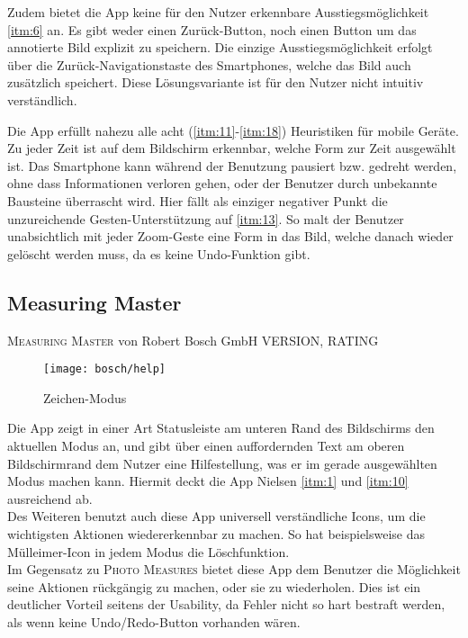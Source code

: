 Zudem bietet die App keine für den Nutzer erkennbare Ausstiegsmöglichkeit \ref{itm:6} an. Es gibt weder einen Zurück-Button, noch einen Button um das annotierte Bild explizit zu speichern. Die einzige Ausstiegsmöglichkeit erfolgt über die Zurück-Navigationstaste des Smartphones, welche das Bild auch zusätzlich speichert. Diese Lösungsvariante ist für den Nutzer nicht intuitiv verständlich. 

Die App erfüllt nahezu alle acht (\ref{itm:11}-\ref{itm:18}) Heuristiken für mobile Geräte. Zu jeder Zeit ist auf dem Bildschirm erkennbar, welche Form zur Zeit ausgewählt ist. Das Smartphone kann während der Benutzung pausiert bzw. gedreht werden, ohne dass Informationen verloren gehen, oder der Benutzer durch unbekannte Bausteine überrascht wird.  Hier fällt als einziger negativer Punkt die unzureichende Gesten-Unterstützung auf \ref{itm:13}. So malt der Benutzer unabsichtlich mit jeder Zoom-Geste eine Form in das Bild, welche danach wieder gelöscht werden muss, da es keine Undo-Funktion gibt. \\

\subsection{Measuring Master}

\textsc{Measuring Master} von Robert Bosch GmbH VERSION, RATING \\

\begin{wrapfigure}{R}{0.4\textwidth}
	\centering
	\texttt{[image: bosch/help]}
	\caption{Zeichen-Modus}	
	\label{fig:bhelp}
\end{wrapfigure}

Die App zeigt in einer Art Statusleiste am unteren Rand des Bildschirms den aktuellen Modus an, und gibt über einen auffordernden Text am oberen Bildschirmrand dem Nutzer eine Hilfestellung, was er im gerade ausgewählten Modus machen kann.  Hiermit deckt die App Nielsen \ref{itm:1} und \ref{itm:10} ausreichend ab. \\

Des Weiteren benutzt auch diese App universell verständliche Icons, um die wichtigsten Aktionen wiedererkennbar zu machen. So hat beispielsweise das Mülleimer-Icon in jedem Modus die Löschfunktion. \\

Im Gegensatz zu \textsc{Photo Measures} bietet diese App dem Benutzer die Möglichkeit seine Aktionen rückgängig zu machen, oder sie zu wiederholen. Dies ist ein deutlicher Vorteil seitens der Usability, da Fehler nicht so hart bestraft werden, als wenn keine Undo/Redo-Button vorhanden wären. \\

